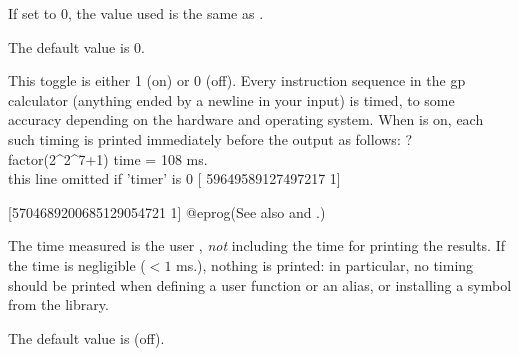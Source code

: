 If set to $0$, the value used is the same as .

The default value is $0$.

\label{se:def,timer}
This toggle is either 1 (on) or 0 (off). Every instruction sequence
in the gp calculator (anything ended by a newline in your input) is timed,
to some accuracy depending on the hardware and operating system. When
 is on, each such timing is printed immediately before the
output as follows:
\bprog
? factor(2^2^7+1)
time = 108 ms.     \\ this line omitted if 'timer' is 0
[     59649589127497217 1]

[5704689200685129054721 1]
@eprog\noindent (See also \kbd{\#} and \kbd{\#\#}.)

The time measured is the user , \emph{not} including the time
for printing the results. If the time is negligible ($< 1$ ms.), nothing is
printed: in particular, no timing should be printed when defining a user
function or an alias, or installing a symbol from the library.

The default value is  (off).

\vfill\eject

